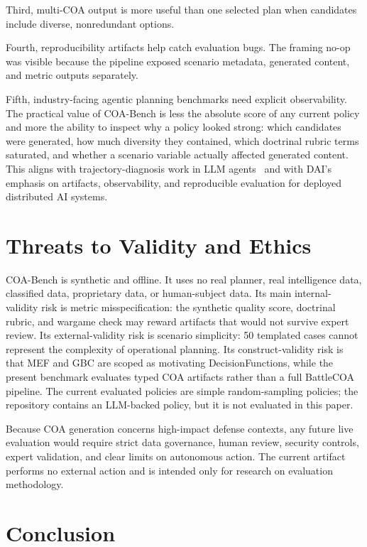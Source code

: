\documentclass[sigconf]{acmart}
\begin{document}
Third, multi-COA output is more useful than one selected plan when candidates include diverse, nonredundant options.

Fourth, reproducibility artifacts help catch evaluation bugs. The framing no-op was visible because the pipeline exposed scenario metadata, generated content, and metric outputs separately.

Fifth, industry-facing agentic planning benchmarks need explicit observability. The practical value of COA-Bench is less the absolute score of any current policy and more the ability to inspect why a policy looked strong: which candidates were generated, how much diversity they contained, which doctrinal rubric terms saturated, and whether a scenario variable actually affected generated content. This aligns with trajectory-diagnosis work in LLM agents~\cite{ou2025agentdiagnose} and with DAI's emphasis on artifacts, observability, and reproducible evaluation for deployed distributed AI systems.

\section{Threats to Validity and Ethics}

COA-Bench is synthetic and offline. It uses no real planner, real intelligence data, classified data, proprietary data, or human-subject data. Its main internal-validity risk is metric misspecification: the synthetic quality score, doctrinal rubric, and wargame check may reward artifacts that would not survive expert review. Its external-validity risk is scenario simplicity: 50 templated cases cannot represent the complexity of operational planning. Its construct-validity risk is that MEF and GBC are scoped as motivating DecisionFunctions, while the present benchmark evaluates typed COA artifacts rather than a full BattleCOA pipeline. The current evaluated policies are simple random-sampling policies; the repository contains an LLM-backed policy, but it is not evaluated in this paper.

Because COA generation concerns high-impact defense contexts, any future live evaluation would require strict data governance, human review, security controls, expert validation, and clear limits on autonomous action. The current artifact performs no external action and is intended only for research on evaluation methodology.

\section{Conclusion}
\end{document}
